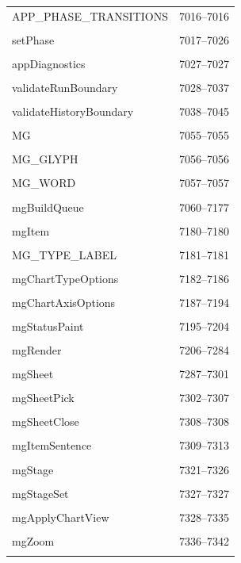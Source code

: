 {\begin{longtable}{@{}p{11cm}r@{}}
APP\_PHASE\_TRANSITIONS & 7016--7016 \\\\\hline
setPhase & 7017--7026 \\\\\hline
appDiagnostics & 7027--7027 \\\\\hline
validateRunBoundary & 7028--7037 \\\\\hline
validateHistoryBoundary & 7038--7045 \\\\\hline
MG & 7055--7055 \\\\\hline
MG\_GLYPH & 7056--7056 \\\\\hline
MG\_WORD & 7057--7057 \\\\\hline
mgBuildQueue & 7060--7177 \\\\\hline
mgItem & 7180--7180 \\\\\hline
MG\_TYPE\_LABEL & 7181--7181 \\\\\hline
mgChartTypeOptions & 7182--7186 \\\\\hline
mgChartAxisOptions & 7187--7194 \\\\\hline
mgStatusPaint & 7195--7204 \\\\\hline
mgRender & 7206--7284 \\\\\hline
mgSheet & 7287--7301 \\\\\hline
mgSheetPick & 7302--7307 \\\\\hline
mgSheetClose & 7308--7308 \\\\\hline
mgItemSentence & 7309--7313 \\\\\hline
mgStage & 7321--7326 \\\\\hline
mgStageSet & 7327--7327 \\\\\hline
mgApplyChartView & 7328--7335 \\\\\hline
mgZoom & 7336--7342 \\\\\hline

\end{longtable}}
